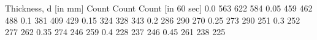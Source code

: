 Thickness, d [in mm]	Count	Count	Count [in 60 sec]
0.0			563	622	584
0.05			459	462	488
0.1			381	409	429
0.15			324	328	343
0.2			286	290	270
0.25			273	290	251
0.3			252	277	262
0.35			274	246	259
0.4			228	237	246
0.45			261	238	225